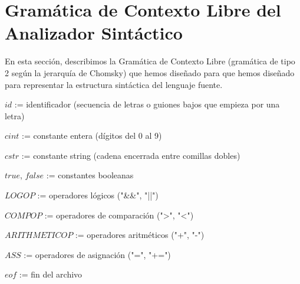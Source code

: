 \documentclass{article}
\begin{document}
\newpage

\section{Gramática de Contexto Libre del Analizador Sintáctico}

En esta sección, describimos la Gramática de Contexto Libre (gramática de tipo 2 según la jerarquía de Chomsky) que hemos diseñado para que hemos diseñado para representar la estructura sintáctica del lenguaje fuente.

\begin{center}
    \begin{tcolorbox}[title=Símbolos no terminales, width=0.6\textwidth]
        $id$ := identificador (secuencia de letras o guiones bajos que empieza por una letra)

        $cint$ := constante entera (dígitos del 0 al 9)

        $cstr$ := constante string (cadena encerrada entre comillas dobles)

        $true$, $false$ := constantes booleanas

        $LOGOP$ := operadores lógicos ("\&\&", "||")

        $COMPOP$ := operadores de comparación (">", "<")

        $ARITHMETICOP$ := operadores aritméticos ("+", "-")

        $ASS$ := operadores de asignación ("=", "+=")

        $eof$ := fin del archivo
    \end{tcolorbox}
\end{center}
\end{document}

